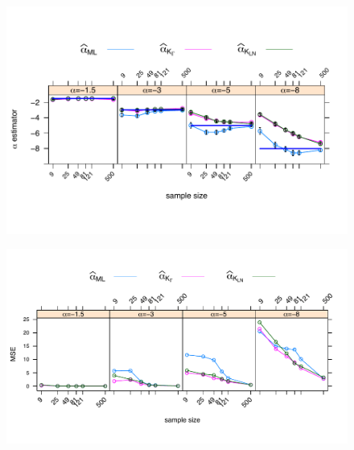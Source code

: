 \documentclass[a0,portrait]{a0poster}
\begin{document}
\begin{multicols}{3}
\begin{center}
 \begin{minipage}[t]{0.96\linewidth}
  	\begin{figure}
	\includegraphics[scale=1.1]{../../../../Figures/IVJIAAIS2017/SinCont/alfa500_sinmenos20_NoContMVyGAyLN_OPTIM_hasta500_MOM1_2_SinCte_Ver2_FINALbarrasdeerror_L3.pdf}\\
	\end{figure}
\end{minipage}
\end{center}
\vspace{0.8cm}
\begin{center}
	\begin{minipage}[t]{0.96\linewidth}
		\begin{figure}
  		\includegraphics[scale=1]{../../../../Figures/IVJIAAIS2017/SinCont/ECM_500_L3MVyGAyLN_OPTIM_hasta500_MOM1_2_SinCte_Ver2_FINAL.pdf}
 		\end{figure}
  	\end{minipage}
\end{center}


\end{multicols}
\end{document}
